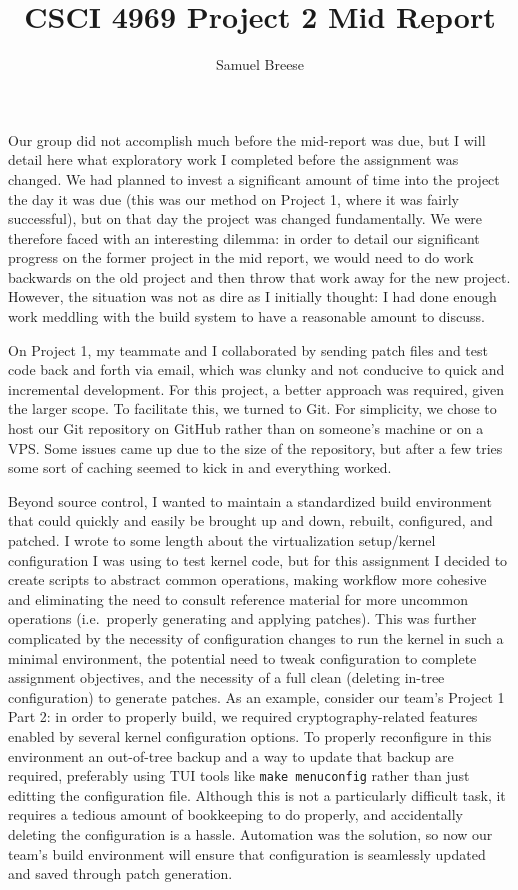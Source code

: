 \documentclass{article}
\title{CSCI 4969 Project 2 Mid Report}
\author{Samuel Breese}
\date{}
\begin{document}
\maketitle

Our group did not accomplish much before the mid-report was due, but I will detail here what exploratory work I completed before the assignment was changed.
We had planned to invest a significant amount of time into the project the day it was due (this was our method on Project 1, where it was fairly successful), but on that day the project was changed fundamentally.
We were therefore faced with an interesting dilemma: in order to detail our significant progress on the former project in the mid report, we would need to do work backwards on the old project and then throw that work away for the new project.
However, the situation was not as dire as I initially thought: I had done enough work meddling with the build system to have a reasonable amount to discuss.

On Project 1, my teammate and I collaborated by sending patch files and test code back and forth via email, which was clunky and not conducive to quick and incremental development.
For this project, a better approach was required, given the larger scope.
To facilitate this, we turned to Git.
For simplicity, we chose to host our Git repository on GitHub rather than on someone's machine or on a VPS\@.
Some issues came up due to the size of the repository, but after a few tries some sort of caching seemed to kick in and everything worked.

Beyond source control, I wanted to maintain a standardized build environment that could quickly and easily be brought up and down, rebuilt, configured, and patched.
I wrote to some length about the virtualization setup/kernel configuration I was using to test kernel code, but for this assignment I decided to create scripts to abstract common operations, making workflow more cohesive and eliminating the need to consult reference material for more uncommon operations (i.e.\ properly generating and applying patches).
This was further complicated by the necessity of configuration changes to run the kernel in such a minimal environment, the potential need to tweak configuration to complete assignment objectives, and the necessity of a full clean (deleting in-tree configuration) to generate patches.
As an example, consider our team's Project 1 Part 2: in order to properly build, we required cryptography-related features enabled by several kernel configuration options.
To properly reconfigure in this environment an out-of-tree backup and a way to update that backup are required, preferably using TUI tools like \texttt{make menuconfig} rather than just editting the configuration file.
Although this is not a particularly difficult task, it requires a tedious amount of bookkeeping to do properly, and accidentally deleting the configuration is a hassle.
Automation was the solution, so now our team's build environment will ensure that configuration is seamlessly updated and saved through patch generation.
\end{document}
